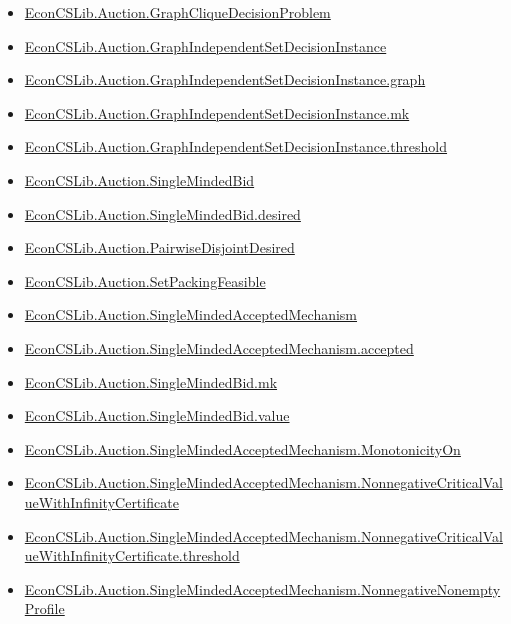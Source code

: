\documentclass[10pt]{article}
\begin{document}
\begin{itemize}[leftmargin=1.2em]
\begin{itemize}[leftmargin=1.2em]
\item \hyperlink{library-prerequisite-a346b9127f5fd8ee}{EconCSLib.Auction.GraphCliqueDecisionProblem}
\item \hyperlink{library-prerequisite-712cf6e368979102}{EconCSLib.Auction.GraphIndependentSetDecisionInstance}
\item \hyperlink{library-prerequisite-2e6e62923f750a76}{EconCSLib.Auction.GraphIndependentSetDecisionInstance.graph}
\item \hyperlink{library-prerequisite-95e3ef5d6ce5a105}{EconCSLib.Auction.GraphIndependentSetDecisionInstance.mk}
\item \hyperlink{library-prerequisite-94e3b66ec7c1cc83}{EconCSLib.Auction.GraphIndependentSetDecisionInstance.threshold}
\item \hyperlink{library-prerequisite-483c43b5ec4710a2}{EconCSLib.Auction.SingleMindedBid}
\item \hyperlink{library-prerequisite-6097423e6bf66aca}{EconCSLib.Auction.SingleMindedBid.desired}
\item \hyperlink{library-prerequisite-119393a00ced951c}{EconCSLib.Auction.PairwiseDisjointDesired}
\item \hyperlink{library-prerequisite-f410589d9b281675}{EconCSLib.Auction.SetPackingFeasible}
\item \hyperlink{library-prerequisite-f84978dc863ab478}{EconCSLib.Auction.SingleMindedAcceptedMechanism}
\item \hyperlink{library-prerequisite-d719892ad5e59a0f}{EconCSLib.Auction.SingleMindedAcceptedMechanism.accepted}
\item \hyperlink{library-prerequisite-5b97c620e5cc0927}{EconCSLib.Auction.SingleMindedBid.mk}
\item \hyperlink{library-prerequisite-94dd9eebdc7571ca}{EconCSLib.Auction.SingleMindedBid.value}
\item \hyperlink{library-prerequisite-2fc861ddfae4229e}{EconCSLib.Auction.SingleMindedAcceptedMechanism.MonotonicityOn}
\item \hyperlink{library-prerequisite-e71f5191d303696d}{EconCSLib.Auction.SingleMindedAcceptedMechanism.NonnegativeCriticalValueWithInfinityCertificate}
\item \hyperlink{library-prerequisite-5ec991f2a5a9cb54}{EconCSLib.Auction.SingleMindedAcceptedMechanism.NonnegativeCriticalValueWithInfinityCertificate.threshold}
\item \hyperlink{library-prerequisite-5f3e60c65349064f}{EconCSLib.Auction.SingleMindedAcceptedMechanism.NonnegativeNonemptyProfile}

\end{itemize}
\end{itemize}
\end{document}

